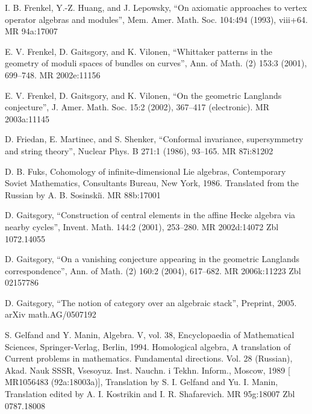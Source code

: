 \par\noindent [Frenkel et al. 1993] I. B. Frenkel, Y.-Z. Huang, and J. Lepowsky, ``On axiomatic approaches to vertex operator algebras and modules'', Mem. Amer. Math. Soc. 104:494 (1993), viii+64. MR 94a:17007

\par\noindent [Frenkel et al. 2001] E. V. Frenkel, D. Gaitsgory, and K. Vilonen, ``Whittaker patterns in the geometry of moduli spaces of bundles on curves'', Ann. of Math. (2) 153:3 (2001), 699--748. MR 2002e:11156

\par\noindent [Frenkel et al. 2002] E. V. Frenkel, D. Gaitsgory, and K. Vilonen, ``On the geometric Langlands conjecture'', J. Amer. Math. Soc. 15:2 (2002), 367--417 (electronic). MR 2003a:11145

\par\noindent [Friedan et al. 1986] D. Friedan, E. Martinec, and S. Shenker, ``Conformal invariance, supersymmetry and string theory'', Nuclear Phys. B 271:1 (1986), 93--165. MR 87i:81202

\par\noindent [Fuks 1986] D. B. Fuks, Cohomology of infinite-dimensional Lie algebras, Contemporary Soviet Mathematics, Consultants Bureau, New York, 1986. Translated from the Russian by A. B. Sosinski\u{\i}. MR 88b:17001

\par\noindent [Gaitsgory 2001] D. Gaitsgory, ``Construction of central elements in the affine Hecke algebra via nearby cycles'', Invent. Math. 144:2 (2001), 253--280. MR 2002d:14072 Zbl 1072.14055

\par\noindent [Gaitsgory 2004] D. Gaitsgory, ``On a vanishing conjecture appearing in the geometric Langlands correspondence'', Ann. of Math. (2) 160:2 (2004), 617--682. MR 2006k:11223 Zbl 02157786

\par\noindent [Gaitsgory 2005] D. Gaitsgory, ``The notion of category over an algebraic stack'', Preprint, 2005. arXiv math.AG/0507192

\par{} S. Gelfand and Y. Manin, Algebra. V, vol. 38, Encyclopaedia of Mathematical Sciences, Springer-Verlag, Berlin, 1994. Homological algebra, A translation of Current problems in mathematics. Fundamental directions. Vol. 28 (Russian), Akad. Nauk SSSR, Vsesoyuz. Inst. Nauchn. i Tekhn. Inform., Moscow, 1989 [ MR1056483 (92a:18003a)], Translation by S. I. Gelfand and Yu. I. Manin, Translation edited by A. I. Kostrikin and I. R. Shafarevich. MR 95g:18007 Zbl 0787.18008

